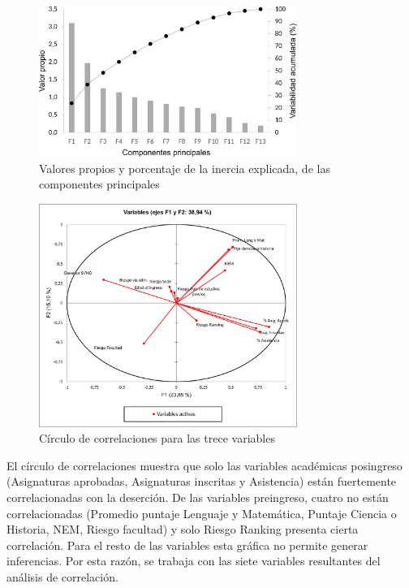 \documentclass[portuguese]{textolivre}
\begin{document}
\begin{figure}[htbp]
 \centering
 \includegraphics[width=0.75\textwidth]{images/fig-005.pdf}
 \caption{Valores propios y porcentaje de la inercia explicada, de las componentes principales}
 \label{Figura 5}
\end{figure}

\begin{figure}[htbp]
 \centering
 \includegraphics[width=0.75\textwidth]{images/fig-006.pdf}
 \caption{Círculo de correlaciones para las trece variables}
 \label{Figura 6}
\end{figure}

El círculo de correlaciones muestra que solo las variables académicas posingreso (Asignaturas aprobadas, Asignaturas inscritas y Asistencia) están fuertemente correlacionadas con la deserción. De las variables preingreso, cuatro no están correlacionadas (Promedio puntaje Lenguaje y Matemática, Puntaje Ciencia o Historia, NEM, Riesgo facultad) y solo Riesgo Ranking presenta cierta correlación. Para el resto de las variables esta gráfica no permite generar inferencias. Por esta razón, se trabaja con las siete variables resultantes del análisis de correlación.
\end{document}
